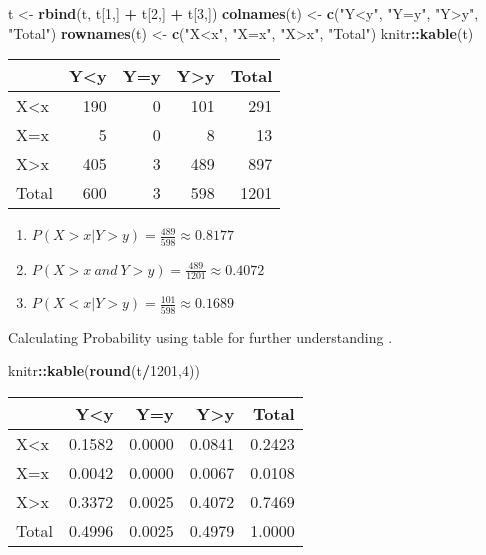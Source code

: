 \documentclass[]{article}
\newenvironment{Shaded}{\begin{snugshade}}{\end{snugshade}}
\newcommand{\DecValTok}[1]{\textcolor[rgb]{0.00,0.00,0.81}{#1}}
\newcommand{\KeywordTok}[1]{\textcolor[rgb]{0.13,0.29,0.53}{\textbf{#1}}}
\newcommand{\NormalTok}[1]{#1}
\newcommand{\OperatorTok}[1]{\textcolor[rgb]{0.81,0.36,0.00}{\textbf{#1}}}
\newcommand{\StringTok}[1]{\textcolor[rgb]{0.31,0.60,0.02}{#1}}
\providecommand{\tightlist}{%
  \setlength{\itemsep}{0pt}\setlength{\parskip}{0pt}}
\begin{document}
\begin{Shaded}
\begin{Highlighting}[]
\NormalTok{t <-}\StringTok{ }\KeywordTok{rbind}\NormalTok{(t, t[}\DecValTok{1}\NormalTok{,] }\OperatorTok{+}\StringTok{ }\NormalTok{t[}\DecValTok{2}\NormalTok{,] }\OperatorTok{+}\StringTok{ }\NormalTok{t[}\DecValTok{3}\NormalTok{,])}
\KeywordTok{colnames}\NormalTok{(t) <-}\StringTok{ }\KeywordTok{c}\NormalTok{(}\StringTok{"Y<y"}\NormalTok{, }\StringTok{"Y=y"}\NormalTok{, }\StringTok{"Y>y"}\NormalTok{, }\StringTok{"Total"}\NormalTok{)}
\KeywordTok{rownames}\NormalTok{(t) <-}\StringTok{ }\KeywordTok{c}\NormalTok{(}\StringTok{"X<x"}\NormalTok{, }\StringTok{"X=x"}\NormalTok{, }\StringTok{"X>x"}\NormalTok{, }\StringTok{"Total"}\NormalTok{)}
\NormalTok{knitr}\OperatorTok{::}\KeywordTok{kable}\NormalTok{(t)}
\end{Highlighting}
\end{Shaded}

\begin{longtable}[]{@{}lrrrr@{}}
\toprule
& Y\textless{}y & Y=y & Y\textgreater{}y & Total\tabularnewline
\midrule
\endhead
X\textless{}x & 190 & 0 & 101 & 291\tabularnewline
X=x & 5 & 0 & 8 & 13\tabularnewline
X\textgreater{}x & 405 & 3 & 489 & 897\tabularnewline
Total & 600 & 3 & 598 & 1201\tabularnewline
\bottomrule
\end{longtable}

\begin{enumerate}
\def\labelenumi{\alph{enumi}.}
\tightlist
\item
  \(P(X>x | Y>y)=\frac{489}{598} \approx 0.8177\)
\item
  \(P(X>x\ and\ Y>y) = \frac{489}{1201} \approx 0.4072\)
\item
  \(P(X<x | Y>y)=\frac{101}{598} \approx 0.1689\)
\end{enumerate}

Calculating Probability using table for further understanding .

\begin{Shaded}
\begin{Highlighting}[]
\NormalTok{knitr}\OperatorTok{::}\KeywordTok{kable}\NormalTok{(}\KeywordTok{round}\NormalTok{(t}\OperatorTok{/}\DecValTok{1201}\NormalTok{,}\DecValTok{4}\NormalTok{))}
\end{Highlighting}
\end{Shaded}

\begin{longtable}[]{@{}lrrrr@{}}
\toprule
& Y\textless{}y & Y=y & Y\textgreater{}y & Total\tabularnewline
\midrule
\endhead
X\textless{}x & 0.1582 & 0.0000 & 0.0841 & 0.2423\tabularnewline
X=x & 0.0042 & 0.0000 & 0.0067 & 0.0108\tabularnewline
X\textgreater{}x & 0.3372 & 0.0025 & 0.4072 & 0.7469\tabularnewline
Total & 0.4996 & 0.0025 & 0.4979 & 1.0000\tabularnewline
\bottomrule
\end{longtable}
\end{document}
